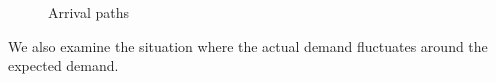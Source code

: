 \newpage


\begin{figure}[h]
  \centering
  \caption{Arrival paths}
\end{figure}


We also examine the situation where the actual demand fluctuates around the expected demand.

\newpage

